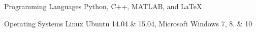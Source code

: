 

\begin{cvskills}

  \cvskill
    {Programming Languages} %
    {Python, C++, MATLAB, and LaTeX} %

  \cvskill
    {Operating Systems} %
    {Linux Ubuntu 14.04 \& 15.04, Microsoft Windows 7, 8, \& 10} %

\end{cvskills}
